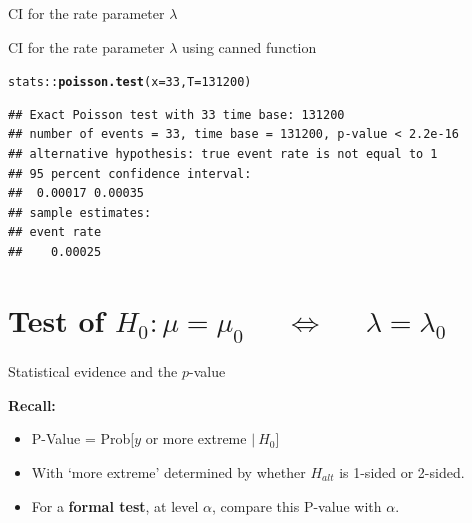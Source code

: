 \documentclass[10pt]{beamer}\usepackage[]{graphicx}\usepackage[]{color}
\makeatletter
\newcommand{\hlnum}[1]{\textcolor[rgb]{0.686,0.059,0.569}{#1}}%
\newcommand{\hlopt}[1]{\textcolor[rgb]{0,0,0}{#1}}%
\newcommand{\hlstd}[1]{\textcolor[rgb]{0.345,0.345,0.345}{#1}}%
\newcommand{\hlkwc}[1]{\textcolor[rgb]{0.333,0.667,0.333}{#1}}%
\newcommand{\hlkwd}[1]{\textcolor[rgb]{0.737,0.353,0.396}{\textbf{#1}}}%
\newenvironment{kframe}{%
 \def\at@end@of@kframe{}%
 \ifinner\ifhmode%
  \def\at@end@of@kframe{\end{minipage}}%
  \begin{minipage}{\columnwidth}%
 \fi\fi%
 \def\FrameCommand##1{\hskip\@totalleftmargin \hskip-\fboxsep
 \colorbox{shadecolor}{##1}\hskip-\fboxsep
     \hskip-\linewidth \hskip-\@totalleftmargin \hskip\columnwidth}%
 \MakeFramed {\advance\hsize-\width
   \@totalleftmargin\z@ \linewidth\hsize
   \@setminipage}}%
 {\par\unskip\endMakeFramed%
 \at@end@of@kframe}
\newenvironment{knitrout}{}{} %
\makeatother
\begin{document}
\begin{frame}[fragile]{CI for the rate  parameter $\lambda$}
\begin{itemize}
		
	\end{itemize}
	
\end{frame}


\begin{frame}[fragile]{CI for the rate  parameter $\lambda$ using canned function}
	
\begin{knitrout}\tiny
{}\color{fgcolor}\begin{kframe}
\begin{alltt}
\hlstd{stats}\hlopt{::}\hlkwd{poisson.test}\hlstd{(}\hlkwc{x} \hlstd{=} \hlnum{33}\hlstd{,} \hlkwc{T} \hlstd{=} \hlnum{131200}\hlstd{)}
\end{alltt}
\begin{verbatim}
## Exact Poisson test with 33 time base: 131200 
## number of events = 33, time base = 131200, p-value < 2.2e-16
## alternative hypothesis: true event rate is not equal to 1 
## 95 percent confidence interval:
##  0.00017 0.00035 
## sample estimates:
## event rate 
##    0.00025
\end{verbatim}
\end{kframe}
\end{knitrout}
	
\end{frame}



\section{Test of $H_{0}: \mu = \mu_{0}$ $\quad \Leftrightarrow \quad$ $\lambda = \lambda_{0}$}


\begin{frame}{Statistical evidence and the $p$-value}
	
	\textbf{Recall:}
	
	\vspace*{1cm}
	
	\begin{itemize}
		\setlength\itemsep{1.2em}
		\item P-Value = Prob[$y$ or more extreme $ |\:H_{0}$]
		
		\item With `more extreme' determined by whether $H_{alt}$ is  1-sided or 2-sided. 
		
		\item For a \textbf{formal test}, at level $\alpha$, compare this P-value with $\alpha$.
	\end{itemize}
	
\end{frame}
\end{document}
